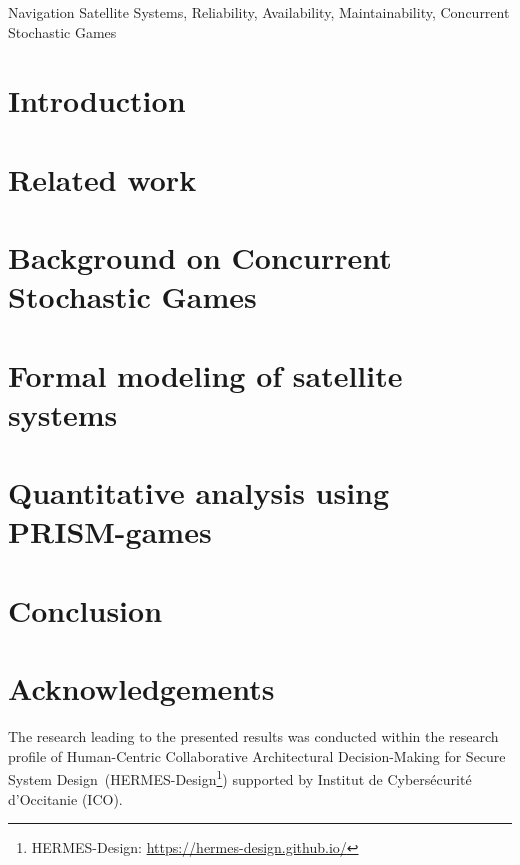 \documentclass[conference]{IEEEtran}
\newcommand{\hermes} {Human-Centric Collaborative Architectural Decision-Making for Secure System Design}
\begin{document}
\begin{IEEEkeywords}
Navigation Satellite Systems, Reliability, Availability, Maintainability, Concurrent Stochastic Games
\end{IEEEkeywords}

\section{Introduction}

\begin{sloppypar}

\end{sloppypar}

\section{ Related work}
\label{sec:rw}
\begin{sloppypar}

\end{sloppypar}

\section{Background on Concurrent Stochastic  Games}
\label{Preliminaries}
\begin{sloppypar}

\end{sloppypar}

\section{Formal modeling of satellite systems}
\label{sattelitemodel}
\begin{sloppypar}

\end{sloppypar}

\section{Quantitative analysis using PRISM-games}\label{useCase}
\label{sec:useCase}
\begin{sloppypar}

\end{sloppypar}


\section{Conclusion}\label{conclusion}
\begin{sloppypar}

\end{sloppypar}

\section*{Acknowledgements}
The research leading to the presented results was conducted within the research profile of \hermes~(HERMES-Design\footnote{HERMES-Design: \url{https://hermes-design.github.io/}}) supported by Institut de Cybersécurité d'Occitanie (ICO).


{\scriptsize
}
\end{document}
